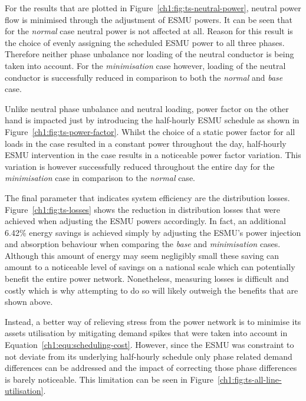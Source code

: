 

For the results that are plotted in Figure~\ref{ch1:fig:ts-neutral-power}, neutral power flow is minimised through the adjustment of ESMU powers.
It can be seen that for the \textit{normal} case neutral power is not affected at all.
Reason for this result is the choice of evenly assigning the scheduled ESMU power to all three phases.
Therefore neither phase unbalance nor loading of the neutral conductor is being taken into account.
For the \textit{minimisation} case however, loading of the neutral conductor is successfully reduced in comparison to both the \textit{normal} and \textit{base} case.



Unlike neutral phase unbalance and neutral loading, power factor on the other hand is impacted just by introducing the half-hourly ESMU schedule as shown in Figure~\ref{ch1:fig:ts-power-factor}.
Whilst the choice of a static power factor for all loads in the  case resulted in a constant power throughout the day, half-hourly ESMU intervention in the  case results in a noticeable power factor variation.
This variation is however successfully reduced throughout the entire day for the \textit{minimisation} case in comparison to the \textit{normal} case.



The final parameter that indicates system efficiency are the distribution losses.
Figure~\ref{ch1:fig:ts-losses} shows the reduction in distribution losses that were achieved when adjusting the ESMU powers accordingly.
In fact, an additional 6.42\% energy savings is achieved simply by adjusting the ESMU's power injection and absorption behaviour when comparing the \textit{base} and \textit{minimisation} cases.
Although this amount of energy may seem negligibly small these saving can amount to a noticeable level of savings on a national scale which can potentially benefit the entire power network.
Nonetheless, measuring losses is difficult and costly which is why attempting to do so will likely outweigh the benefits that are shown above.

Instead, a better way of relieving stress from the power network is to minimise its assets utilisation by mitigating demand spikes that were taken into account in Equation~\ref{ch1:equ:scheduling-cost}.
However, since the ESMU was constraint to not deviate from its underlying half-hourly schedule only phase related demand differences can be addressed and the impact of correcting those phase differences is barely noticeable.
This limitation can be seen in Figure~\ref{ch1:fig:ts-all-line-utilisation}.

